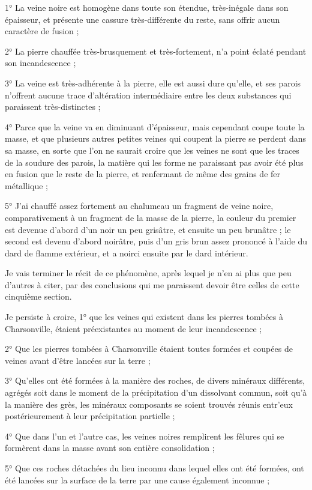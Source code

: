 \documentclass[a4paper, 12pt, oneside, french]{article}
\begin{document}
1° La veine noire est homogène dans toute son étendue, très-inégale dans son épaisseur, et présente une cassure très-différente du reste, sans offrir aucun caractère de fusion ;

2° La pierre chauffée très-brusquement et très-fortement, n'a point éclaté pendant son incandescence ;

3° La veine est très-adhérente à la pierre, elle est aussi dure qu'elle, et ses parois n'offrent aucune trace d'altération intermédiaire entre les deux substances qui paraissent très-distinctes ;

4° Parce que la veine va en diminuant d'épaisseur, mais cependant coupe toute la masse, et que plusieurs autres petites veines qui coupent la pierre se perdent dans sa masse, en sorte que l'on ne saurait croire que les veines ne sont que les traces de la soudure des parois, la matière qui les forme ne paraissant pas avoir été plus en fusion que le reste de la pierre, et renfermant de même des grains de fer métallique ;

5° J'ai chauffé assez fortement au chalumeau un fragment de veine noire, comparativement à un fragment de la masse de la pierre, la couleur du premier est devenue d'abord d'un noir un peu grisâtre, et ensuite un peu brunâtre ; le second est devenu d'abord noirâtre, puis d'un gris brun assez prononcé à l'aide du dard de flamme extérieur, et a noirci ensuite par le dard intérieur.

Je vais terminer le récit de ce phénomène, après lequel je n'en ai plus que peu d'autres à citer, par des conclusions qui me paraissent devoir être celles de cette cinquième section.

Je persiste à croire, 1° que les veines qui existent dans les pierres tombées à Charsonville, étaient préexistantes au moment de leur incandescence ;

2° Que les pierres tombées à Charsonville étaient toutes formées et coupées de veines avant d'être lancées sur la terre ;

3° Qu'elles ont été formées à la manière des roches, de divers minéraux différents, agrégés soit dans le moment de la précipitation d'un dissolvant commun, soit qu'à la manière des grès, les minéraux composants se soient trouvés réunis entr'eux postérieurement à leur précipitation partielle ;

4° Que dans l'un et l'autre cas, les veines noires remplirent les fêlures qui se formèrent dans la masse avant son entière consolidation ;

5° Que ces roches détachées du lieu inconnu dans lequel elles ont été formées, ont été lancées sur la surface de la terre par une cause également inconnue ;
\end{document}
